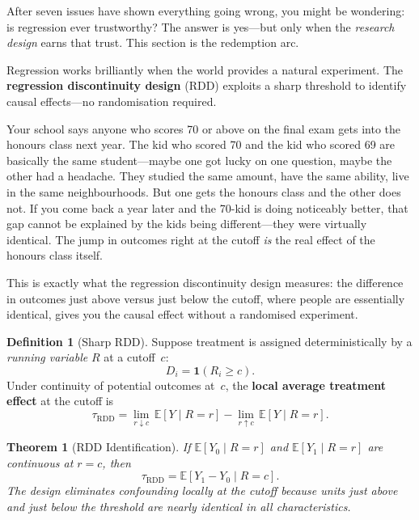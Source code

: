 \documentclass[11pt,a4paper]{article}
\theoremstyle{definition}
\newtheorem{definition}{Definition}[section]
\theoremstyle{plain}
\newtheorem{theorem}{Theorem}[section]
\theoremstyle{remark}
\newcommand{\E}{\mathbb{E}}
\begin{document}
After seven issues have shown everything going wrong, you might be wondering: is regression ever trustworthy? The answer is yes---but only when the \emph{research design} earns that trust. This section is the redemption arc.

Regression works brilliantly when the world provides a natural experiment.
The \textbf{regression discontinuity design} (RDD) exploits a sharp threshold to identify causal effects---no randomisation required.

\begin{toystory}[title={The Kid Who Scored 69 vs.\ The Kid Who Scored 70}]
Your school says anyone who scores 70 or above on the final exam gets into the honours class next year. The kid who scored 70 and the kid who scored 69 are basically the same student---maybe one got lucky on one question, maybe the other had a headache. They studied the same amount, have the same ability, live in the same neighbourhoods. But one gets the honours class and the other does not. If you come back a year later and the 70-kid is doing noticeably better, that gap cannot be explained by the kids being different---they were virtually identical. The jump in outcomes right at the cutoff \emph{is} the real effect of the honours class itself.

This is exactly what the regression discontinuity design measures: the difference in outcomes just above versus just below the cutoff, where people are essentially identical, gives you the causal effect without a randomised experiment.
\end{toystory}

\begin{definition}[Sharp RDD]
Suppose treatment is assigned deterministically by a \emph{running variable} $R$ at a cutoff~$c$:
\[
  D_i = \mathbf{1}(R_i \geq c).
\]
Under continuity of potential outcomes at~$c$, the \textbf{local average treatment effect} at the cutoff is
\begin{equation}\label{eq:rdd}
  \tau_{\text{RDD}} = \lim_{r \downarrow c}\, \E[Y \mid R = r] - \lim_{r \uparrow c}\, \E[Y \mid R = r].
\end{equation}
\end{definition}

\begin{theorem}[RDD Identification]\label{thm:rdd}
If $\E[Y_0 \mid R = r]$ and $\E[Y_1 \mid R = r]$ are continuous at $r = c$, then
\[
  \tau_{\text{RDD}} = \E[Y_1 - Y_0 \mid R = c].
\]
The design eliminates confounding \emph{locally} at the cutoff because units just above and just below the threshold are nearly identical in all characteristics.
\end{theorem}
\end{document}
